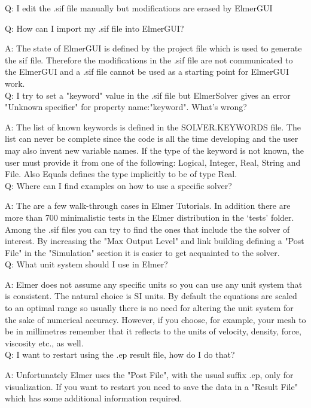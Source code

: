     Q: I edit the .sif file manually but modifications are erased by ElmerGUI

    Q: How can I import my .sif file into ElmerGUI?

    A: The state of ElmerGUI is defined by the project file which is used to generate the sif file. Therefore the modifications in the .sif file are not communicated to the ElmerGUI and a .sif file cannot be used as a starting point for ElmerGUI work.\\

    Q: I try to set a "keyword" value in the .sif file but ElmerSolver gives an error "Unknown specifier" for property name:"keyword". What's wrong?

    A: The list of known keywords is defined in the SOLVER.KEYWORDS file. The list can never be complete since the code is all the time developing and the user may also invent new variable names. If the type of the keyword is not known, the user must provide it from one of the following: Logical, Integer, Real, String and File. Also Equals defines the type implicitly to be of type Real.\\

    Q: Where can I find examples on how to use a specific solver?

    A: The are a few walk-through cases in Elmer Tutorials. In addition there are more than 700 minimalistic tests in the Elmer distribution in the `tests' folder.  Among the .sif files you can try to find the ones that include the the solver of interest. By increasing the "Max Output Level" and link building defining a "Post File" in the "Simulation" section it is easier to get acquainted to the solver.\\

    Q: What unit system should I use in Elmer?

    A: Elmer does not assume any specific units so you can use any unit system that is consistent. The natural choice is SI units. By default the equations are scaled to an optimal range so usually there is no need for altering the unit system for the sake of numerical accuracy. However, if you choose, for example, your mesh to be in millimetres remember that it reflects to the units of velocity, density, force, viscosity etc., as well.\\

    Q: I want to restart using the .ep result file, how do I do that?

    A: Unfortunately Elmer uses the "Post File", with the usual suffix .ep, only for visualization. If you want to restart you need to save the data in a "Result File" which has some additional information required.\\

